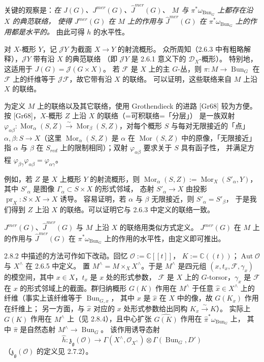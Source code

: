 关键的观察是：\emph{在 $J(G)$、$J^{mer}(G)$、$\widehat{J}^{mer}(G)$、
$M$ 与 $\pi^*\omega_{\operatorname{Bun}_G}$ 上都存在沿 $X$ 的典范联络，
使得 $J^{mer}(G)$ 在 $M$ 上的作用与 $\widehat{J}^{mer}(G)$ 在
$\pi^*\omega_{\operatorname{Bun}_G}$ 上的作用都是水平的。}
由此可得 $h$ 的水平性。

对 $X$-概形 $Y$，记 $\mathcal{J}Y$ 为截面 $X\to Y$ 的射流概形。
众所周知（2.6.3 中有粗略解释），$\mathcal{J}Y$ 带有沿 $X$ 的典范联络
（即 $\mathcal{J}Y$ 是 2.6.1 意义下的 $\mathcal{D}_X$-概形）。
特别地，这适用于 $J(G)=\mathcal{J}(G\times X)$。
若 $\mathcal{F}$ 是 $X$ 上的主 $G$-丛，则 $\pi:M\to\operatorname{Bun}_G$
在 $\mathcal{F}$ 上的纤维等于 $\mathcal{J}\mathcal{F}$，故它带有沿 $X$ 的联络。
可以证明，这些联络来自 $M$ 上沿 $X$ 的联络。

为定义 $M$ 上的联络以及其它联络，使用 Grothendieck 的进路 [Gr68] 较为方便。
按 [Gr68]，$X$-概形 $Z$ 上沿 $X$ 的联络（=可积联络=「分层」）
是一族双射 $\varphi_{\alpha\beta}:\operatorname{Mor}_\alpha(S,Z)\xrightarrow{\sim}
\operatorname{Mor}_\beta(S,Z)$，对每个概形 $S$ 与每对无限接近的「点」
$\alpha,\beta:S\to X$（这里 $\operatorname{Mor}_\alpha(S,Z)$ 是 $\alpha$ 在
$\operatorname{Mor}(S,Z)$ 中的原像，「无限接近」指 $\alpha$ 与 $\beta$ 在
$S_{red}$ 上的限制相同）；双射 $\varphi_{\alpha\beta}$ 要求关于 $S$ 具有函子性，
并满足方程 $\varphi_{\beta\gamma}\varphi_{\alpha\beta}=\varphi_{\alpha\gamma}$。

例如，若 $Z$ 是 $X$ 上概形 $Y$ 的射流概形，则
$\operatorname{Mor}_\alpha(S,Z):=\operatorname{Mor}_X(S'_\alpha,Y)$，
其中 $S'_\alpha$ 是图像 $\Gamma_\alpha\subset S\times X$ 的形式邻域，
态射 $S'_\alpha\to X$ 由投影 $\operatorname{pr}_X:S\times X\to X$ 诱导。
容易证明，若 $\alpha$ 与 $\beta$ 无限接近，则 $S'_\alpha=S'_\beta$，
于是我们得到 $Z$ 上沿 $X$ 的联络。可以证明它与 2.6.3 中定义的联络一致。


$J^{mer}(G)$、$\widehat{J}^{mer}(G)$ 与 $M$ 上沿 $X$ 的联络用类似方式定义。
$J^{mer}(G)$ 在 $M$ 上的作用与 $\widehat{J}^{mer}(G)$ 在
$\pi^*\omega_{\operatorname{Bun}_G}$ 上的作用的水平性，由定义即可推出。

 2.8.2 中描述的方法可作如下改动。回忆 $\mathcal{O}:=\mathbb{C}[[t]]$，
$K:=\mathbb{C}((t))$；$\operatorname{Aut}\mathcal{O}$ 与 $X^\wedge$ 在 2.6.5 中定义。
置 $M^\wedge=M\times_X X^\wedge$。于是 $M^\wedge$ 是四元组
$(x,t_x,\mathcal{F},\gamma_x)$ 的模空间，其中 $x\in X$，$t_x$ 是 $x$ 处的形式参数，
$\mathcal{F}$ 是 $X$ 上的 $G$-torsor，$\gamma_x$ 是 $\mathcal{F}$ 在 $x$
的形式邻域上的截面。群归纳概形 $G(K)$ 作用在 $M^\wedge$ 于任意
$\hat{x}\in X^\wedge$ 上的纤维（事实上该纤维等于 $\operatorname{Bun}_{G,x}$，
其中 $x$ 是 $\hat{x}$ 在 $X$ 中的像，故 $G(K_x)$ 作用在纤维上；
另一方面，与 $\hat{x}$ 对应的 $x$ 处形式参数给出同构 $K_x\xrightarrow{\sim}K$）。
实际上 $G(K)$ 作用在 $M^\wedge$ 上（见 2.8.4），且中心扩张 $\widehat{G(K)}$
作用在 $\hat{\pi}^*\omega_{\operatorname{Bun}_G}$ 上，
其中 $\hat{\pi}$ 是自然态射 $M^\wedge\to\operatorname{Bun}_G$。
该作用诱导态射
\[
  \hat{h}:\mathfrak{z}_{\mathfrak{g}}(\mathcal{O})\longrightarrow
  \Gamma(X^\wedge,\mathcal{O}_{X^\wedge})\otimes\Gamma(\operatorname{Bun}_G,D')
\]
（$\mathfrak{z}_{\mathfrak{g}}(\mathcal{O})$ 的定义见 2.7.2）。

